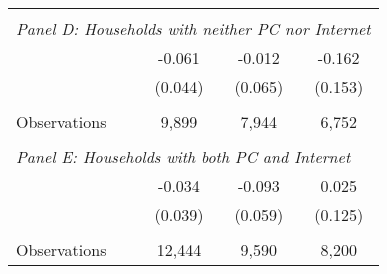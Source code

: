 {\begin{tabular}{lccc}
&  &  &   \\
\multicolumn{4}{l}{\textit{Panel D: Households with neither PC nor Internet}} \\
\hspace{3mm}        &      -0.061   &      -0.012   &      -0.162   \\
                    &     (0.044)   &     (0.065)   &     (0.153)   \\
                    &               &               &               \\
\hspace{3mm}Observations&       9,899   &       7,944   &       6,752   \\
 
&  &  &   \\
\multicolumn{4}{l}{\textit{Panel E: Households with both PC and Internet}} \\
\hspace{3mm}        &      -0.034   &      -0.093   &       0.025   \\
                    &     (0.039)   &     (0.059)   &     (0.125)   \\
                    &               &               &               \\
\hspace{3mm}Observations&      12,444   &       9,590   &       8,200   \\
 

\bottomrule
\end{tabular}
}
